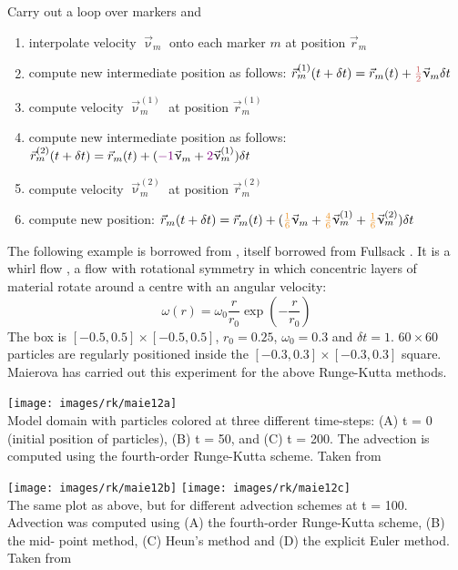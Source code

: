 \begin{itemize}
Carry out a loop over markers and 
\begin{enumerate}
\item interpolate velocity $\vec\upnu_{m}$ onto each marker $m$ at position $\vec r_m$
\item compute new intermediate position as follows: 
$\vec r_m^{(1)}(t+\delta t)=\vec r_m(t) + {\color{chestnut} \frac{1}{2}} \vec\upnu_m \delta t$
\item compute velocity $\vec\upnu_{m}^{(1)}$ at position $\vec r_m^{(1)}$
\item compute new intermediate position as follows: 
$\vec r_m^{(2)}(t+\delta t)=\vec r_m(t) + ( {\color{violet}-1} \vec\upnu_m 
+ {\color{violet}2} \vec\upnu_m^{(1)} ) \delta t$
\item compute velocity $\vec\upnu_{m}^{(2)}$ at position $\vec r_m^{(2)}$
\item compute new position: 
$\vec r_m(t+\delta t)=\vec r_m(t) + ( 
{\color{carrotorange} \frac16} \vec\upnu_m + 
{\color{carrotorange} \frac46} \vec\upnu_m^{(1)} + 
{\color{carrotorange} \frac16} \vec\upnu_m^{(2)}    )\delta t$ 
\end{enumerate}

\end{itemize}

The following example is borrowed from \cite{maie12}, itself borrowed from Fullsack \cite[Section 5.4]{full95}.
It is a whirl flow \cite{otti89}, a flow with rotational symmetry in which concentric layers of material
rotate around  a centre with an angular velocity:
\[
\omega(r)= \omega_0 \frac{r}{r_0} \exp\left(-\frac{r}{r_0}  \right)
\]  
The box is $[-0.5,0.5]\times[-0.5,0.5]$, $r_0=0.25$, $\omega_0=0.3$ and $\delta t=1$. 
$60\times 60$ particles are regularly positioned inside the $[-0.3,0.3]\times[-0.3,0.3]$ square.
Maierova \cite{maie12} has carried out this experiment for the above Runge-Kutta methods.

\begin{center}
\texttt{[image: images/rk/maie12a]}\\
{\captionfont Model domain with particles colored at three
different time-steps: (A) t = 0 (initial position of particles), (B) t = 50, and (C) t = 200.
The advection is computed using the fourth-order Runge-Kutta scheme. Taken from \cite{maie12}}
\end{center}

\begin{center}
\texttt{[image: images/rk/maie12b]}
\texttt{[image: images/rk/maie12c]}\\
{\captionfont The same plot as above, but for different advection schemes at t = 100.
Advection was computed using (A) the fourth-order Runge-Kutta scheme, (B) the mid-
point method, (C) Heun's method and (D) the explicit Euler method. Taken from \cite{maie12}}
\end{center}


